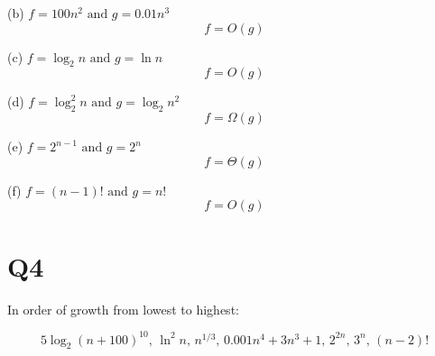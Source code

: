 \documentclass[12pt]{article}
\begin{document}
(b) $f = 100n^2 \text{ and } g = 0.01n^3 $ $$f = O(g)$$

(c) $f = \log_2 n \text{ and } g = \ln n $ $$f = O(g)$$

(d) $f = \log_2^2 n \text{ and } g = \log_2 n^2 $ $$f = \Omega(g)$$

(e) $f =  2^{n-1} \text{ and } g = 2^n$ $$f = \Theta(g)$$

(f) $f =  (n-1)! \text{ and } g = n! $ $$f = O(g)$$


\bigskip
\section*{Q4}

In order of growth from lowest to highest:

$$ 5 \log_2(n+100)^{10} \text{, } \ln^2 n \text{, }  n^{1/3} \text{, } 0.001n^4 + 3n^3 + 1 \text{, } 2^{2n} \text{, } 3^n \text{, } (n-2)! $$
\end{document}
